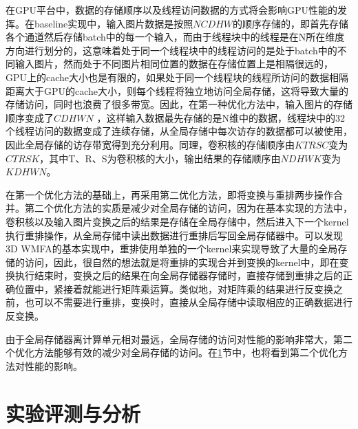 在GPU平台中，数据的存储顺序以及线程访问数据的方式将会影响GPU性能的发挥。在baseline实现中，输入图片数据是按照$NCDHW$的顺序存储的，即首先存储各个通道然后存储batch中的每一个输入，而由于线程块中的线程是在N所在维度方向进行划分的，这意味着处于同一个线程块中的线程访问的是处于batch中的不同输入图片，然而处于不同图片相同位置的数据在存储位置上是相隔很远的，GPU上的cache大小也是有限的，如果处于同一个线程块的线程所访问的数据相隔距离大于GPU的cache大小，则每个线程将独立地访问全局存储，这将导致大量的存储访问，同时也浪费了很多带宽。因此，在第一种优化方法中，输入图片的存储顺序变成了$CDHWN$ ，这样输入数据最先存储的是N维中的数据，线程块中的32个线程访问的数据变成了连续存储，从全局存储中每次访存的数据都可以被使用，因此全局存储的访存带宽得到充分利用。同理，卷积核的存储顺序由$KTRSC$变为$CTRSK$，其中T、R、S为卷积核的大小，输出结果的存储顺序由$NDHWK$变为$KDHWN$。

在第一个优化方法的基础上，再采用第二优化方法，即将变换与重排两步操作合并。第二个优化方法的实质是减少对全局存储的访问，因为在基本实现的方法中，卷积核以及输入图片变换之后的结果是存储在全局存储中，然后进入下一个kernel执行重排操作，从全局存储中读出数据进行重排后写回全局存储器中。可以发现3D WMFA的基本实现中，重排使用单独的一个kernel来实现导致了大量的全局存储的访问，因此，很自然的想法就是将重排的实现合并到变换的kernel中，即在变换执行结束时，变换之后的结果在向全局存储器存储时，直接存储到重排之后的正确位置中，紧接着就能进行矩阵乘运算。类似地，对矩阵乘的结果进行反变换之前，也可以不需要进行重排，变换时，直接从全局存储中读取相应的正确数据进行反变换。

由于全局存储器离计算单元相对最远，全局存储的访问对性能的影响非常大，第二个优化方法能够有效的减少对全局存储的访问。在\ref{experiment}节中，也将看到第二个优化方法对性能的影响。


\section{实验评测与分析}
\label{experiment}
